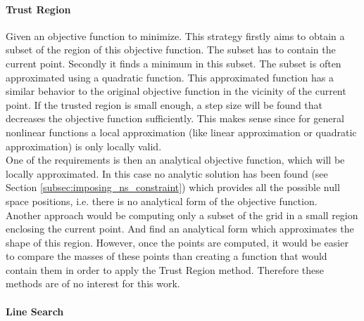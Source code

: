 \paragraph{Trust Region}
\label{subsec:tregion}

Given an objective function to minimize. This  strategy firstly aims to obtain a subset of the region of this objective function. The subset has to contain the current point. Secondly it finds a minimum in this subset. The subset is often approximated using a quadratic function. This approximated function has a similar behavior to the original objective function in the vicinity of the current point. If the trusted region is small enough, a step size will be found that decreases the objective function sufficiently. This makes sense since for general nonlinear functions a local approximation (like linear approximation or quadratic approximation)  is only locally valid. \\ 
%
One of the requirements is then an analytical objective function, which will be locally approximated. In this case no analytic solution has been found (see Section \ref{subsec:imposing_ns_constraint}) which  provides all the possible null space positions, i.e. there is no analytical form of the objective function.\\
%
%
Another approach would be computing only a subset of the grid in a small region enclosing the current point. And find an analytical form which approximates the shape of this region. However, once the points are computed, it would be easier to compare the masses of these points than creating a function that would contain them in order to apply the Trust Region method. Therefore these methods are of no interest for this work.





\paragraph{Line Search}
\label{subsec:lsearch}



